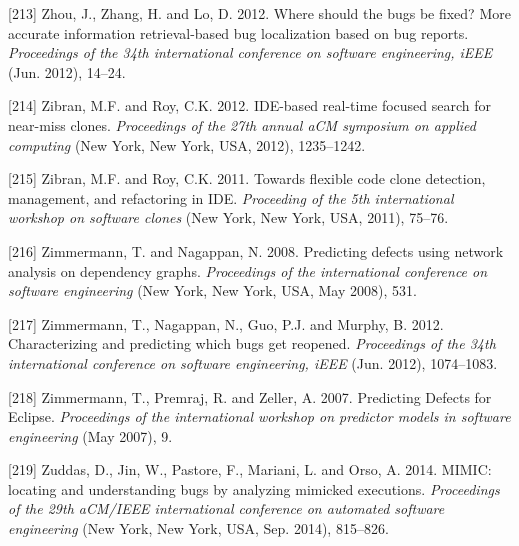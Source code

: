 \documentclass[12pt]{report}
\begin{document}
\hypertarget{ref-Zhou2012}{}
{[}213{]} Zhou, J., Zhang, H. and Lo, D. 2012. Where should the bugs be
fixed? More accurate information retrieval-based bug localization based
on bug reports. \emph{Proceedings of the 34th international conference
on software engineering, iEEE} (Jun. 2012), 14--24.

\hypertarget{ref-Zibran2012}{}
{[}214{]} Zibran, M.F. and Roy, C.K. 2012. IDE-based real-time focused
search for near-miss clones. \emph{Proceedings of the 27th annual aCM
symposium on applied computing} (New York, New York, USA, 2012),
1235--1242.

\hypertarget{ref-Zibran2011}{}
{[}215{]} Zibran, M.F. and Roy, C.K. 2011. Towards flexible code clone
detection, management, and refactoring in IDE. \emph{Proceeding of the
5th international workshop on software clones} (New York, New York, USA,
2011), 75--76.

\hypertarget{ref-Zimmermann2008}{}
{[}216{]} Zimmermann, T. and Nagappan, N. 2008. Predicting defects using
network analysis on dependency graphs. \emph{Proceedings of the
international conference on software engineering} (New York, New York,
USA, May 2008), 531.

\hypertarget{ref-Zimmermann2012}{}
{[}217{]} Zimmermann, T., Nagappan, N., Guo, P.J. and Murphy, B. 2012.
Characterizing and predicting which bugs get reopened. \emph{Proceedings
of the 34th international conference on software engineering, iEEE}
(Jun. 2012), 1074--1083.

\hypertarget{ref-Zimmermann2007}{}
{[}218{]} Zimmermann, T., Premraj, R. and Zeller, A. 2007. Predicting
Defects for Eclipse. \emph{Proceedings of the international workshop on
predictor models in software engineering} (May 2007), 9.

\hypertarget{ref-Zuddas2014}{}
{[}219{]} Zuddas, D., Jin, W., Pastore, F., Mariani, L. and Orso, A.
2014. MIMIC: locating and understanding bugs by analyzing mimicked
executions. \emph{Proceedings of the 29th aCM/IEEE international
conference on automated software engineering} (New York, New York, USA,
Sep. 2014), 815--826.

\end{document}

